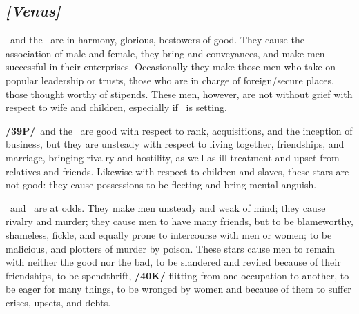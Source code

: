 \secbr
{}
\subsection{\textit{[Venus]}}
\Venus\, and the \Sun\, are in harmony, glorious, bestowers of good. They cause the association of male and female, they bring  and conveyances, and make men successful in their enterprises. Occasionally they make those men who take on popular leadership or trusts, those who are in charge of foreign/secure places, those thought worthy of stipends. These men, however, are not without grief with respect to wife and children, especially if \Venus\, is setting.

\textbf{/39P/}\Venus\, and the \Moon\, are good with respect to rank, acquisitions, and the inception of business, but they are unsteady with respect to living together, friendships, and marriage, bringing rivalry and hostility, as well as ill-treatment and upset from relatives and friends. Likewise with respect to children and slaves, these stars are not good: they cause possessions to be fleeting and bring mental anguish.

\Venus\, and \Mars\, are at odds. They make men unsteady and weak of mind; they cause rivalry and murder; they cause men to have many friends, but to be blameworthy, shameless, fickle, and equally prone to intercourse with men or women; to be malicious, and plotters of murder by poison. These stars cause men to remain with neither the good nor the bad, to be slandered and reviled because of their friendships, to be spendthrift, \textbf{/40K/} flitting from one occupation to another, to be eager for many things, to be wronged by women and because of them to suffer crises, upsets, and debts.

